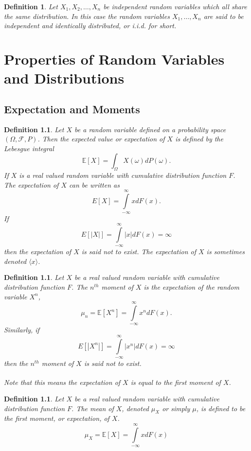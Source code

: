 \documentclass[1pt]{report}
\newtheorem{defn}[thm]{Definition}
\newcommand{\<}{\langle}
\renewcommand{\>}{\rangle}
\newcommand{\FF}{\mathcal{F}}
\newcommand{\E}{\mathbb{E}}
\begin{document}
\begin{defn}\label{def:iid}
Let $X_1,X_2, \dots, X_n$ be independent random variables which all share the same distribution. In this case the random variables $X_1, \dots, X_n$ are said to be \emph{independent and identically distributed}, or \emph{i.i.d.} for short.
\end{defn}
\chapter{Properties of Random Variables and Distributions}
\section{Expectation and Moments}
\begin{defn}\label{def:expectation}
Let $X$ be a random variable defined on a probability space $(\Omega, \FF, P)$. Then the \emph{expected value} or \emph{expectation} of $X$ is defined by the Lebesgue integral
$$\E[X] = \int_\Omega  X(\omega) dP(\omega).$$
If $X$ is a real valued random variable with cumulative distribution function $F$. The expectation of $X$ can be written as  
$$E[X] = \int\limits_{-\infty}^\infty x dF(x).$$
If 
$$E[|X|] = \int\limits_{-\infty}^\infty |x| dF(x) = \infty$$
then the expectation of $X$ is said not to exist. The expectation of $X$ is sometimes denoted $\< x\>$.
\end{defn}
\begin{defn}\label{def:moment}
Let $X$ be a real valued random variable with cumulative distribution function $F$. The $n^{th}$ \emph{moment} of $X$ is the expectation of the random variable $X^n$,
$$\mu_n = \E[X^n] = \int\limits_{-\infty}^\infty x^n dF(x).$$
Similarly, if
$$E[|X^n|] = \int\limits_{-\infty}^\infty |x^n| dF(x) = \infty$$
then the $n^{th}$ moment of $X$ is said not to exist.\\
\\
Note that this means the expectation of $X$ is equal to the first moment of $X$.\\
\end{defn}
\begin{defn}\label{def:mean}
Let $X$ be a real valued random variable with cumulative distribution function $F$. The \emph{mean} of $X$, denoted $\mu_X$ or simply $\mu$, is defined to be the first moment, or expectation, of $X$.
$$\mu_X = \E[X] = \int\limits_{-\infty}^\infty x dF(x)$$
\end{defn}
\end{document}
